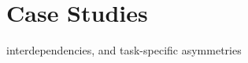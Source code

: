 \graphicspath{{Figures/}}

\chapter{Case Studies} %
\label{cha:case_studies}

 interdependencies, and task-specific asymmetries
 




 

